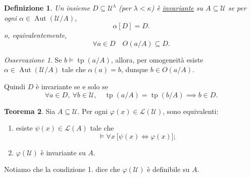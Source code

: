 \documentclass[10pt]{article}
\newcommand{\1}{\mathds{1}}
\theoremstyle{definition}%
\newtheorem{thm}{Teorema}[section]
\theoremstyle{plain}
\newtheorem{definizione}[thm]{Definizione}
\theoremstyle{remark}
\newtheorem*{oss}{Osservazione}
\begin{document}
\begin{definizione}
Un insieme \(D \subseteq \mathcal{U}^{\lambda}\) (per \(\lambda<\kappa\)) è \uline{invariante} su \(A \subseteq\mathcal{U}\) se per ogni \(\alpha \in \operatorname{Aut}(\mathcal{U}/A)\),
\begin{equation*}
\alpha[D]=D.
\end{equation*}
o, equivalentemente,
\begin{equation*}
\forall a \in D\quad O(a/A) \subseteq D.
\end{equation*}
\end{definizione}
\begin{oss}
Se \(b\vDash \operatorname{tp}(a/A)\), allora, per omogeneità esiste \(\alpha \in \operatorname{Aut}(\mathcal{U}/A)\) tale che \(\alpha(a)=b\), dunque \(b \in O(a/A)\).

Quindi \(D\) è invariante se e solo se
\begin{equation*}
\forall  a \in D,\ \forall  b \in \mathcal{U},\quad \operatorname{tp}(a/A) =\operatorname{tp}(b/A)\implies b \in D.
\end{equation*}
\end{oss}
\begin{thm}
Sia \(A \subseteq \mathcal{U}\). Per ogni \(\varphi(x) \in \mathcal{L}(\mathcal{U})\), sono equivalenti:
\begin{enumerate}
\item esiste \(\psi(x) \in \mathcal{L}(A)\) tale che
\begin{equation*}
 \vDash \forall x\ \big[\psi(x)\iff\varphi(x)\big];
\end{equation*}
\item \(\varphi(\mathcal{U})\) è invariante su \(A\).
\end{enumerate}
\label{thm:oijsoidkjnjjjjjd}
\end{thm}

Notiamo che la condizione 1. dice che \(\varphi(\mathcal{U})\) è definibile su \(A\).
\end{document}
